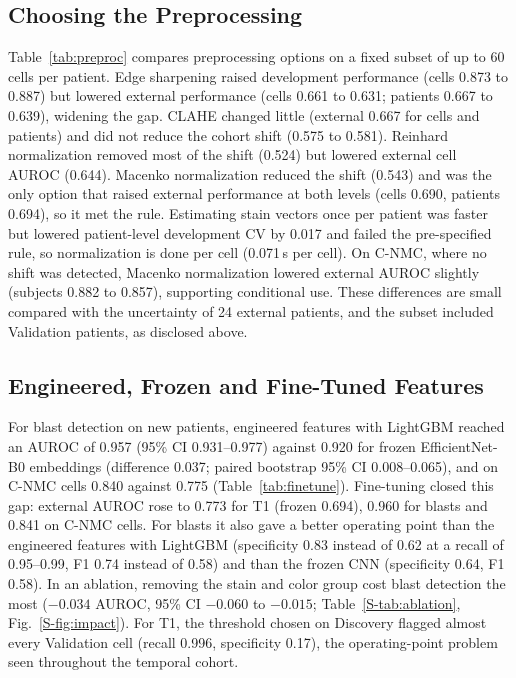 \documentclass[journal]{IEEEtran}
\begin{document}
\subsection{Choosing the Preprocessing}
\label{sec:preproc}
Table~\ref{tab:preproc} compares preprocessing options on a fixed subset of up to 60 cells per patient. Edge sharpening raised development performance (cells 0.873 to 0.887) but lowered external performance (cells 0.661 to 0.631; patients 0.667 to 0.639), widening the gap. CLAHE changed little (external 0.667 for cells and patients) and did not reduce the cohort shift (0.575 to 0.581). Reinhard normalization removed most of the shift (0.524) but lowered external cell AUROC (0.644). Macenko normalization reduced the shift (0.543) and was the only option that raised external performance at both levels (cells 0.690, patients 0.694), so it met the rule. Estimating stain vectors once per patient was faster but lowered patient-level development CV by 0.017 and failed the pre-specified rule, so normalization is done per cell (0.071\,s per cell). On C-NMC, where no shift was detected, Macenko normalization lowered external AUROC slightly (subjects 0.882 to 0.857), supporting conditional use. These differences are small compared with the uncertainty of 24 external patients, and the subset included Validation patients, as disclosed above.



\subsection{Engineered, Frozen and Fine-Tuned Features}
For blast detection on new patients, engineered features with LightGBM reached an AUROC of 0.957 (95\% CI 0.931--0.977) against 0.920 for frozen EfficientNet-B0 embeddings (difference 0.037; paired bootstrap 95\% CI 0.008--0.065), and on C-NMC cells 0.840 against 0.775 (Table~\ref{tab:finetune}). Fine-tuning closed this gap: external AUROC rose to 0.773 for T1 (frozen 0.694), 0.960 for blasts and 0.841 on C-NMC cells. For blasts it also gave a better operating point than the engineered features with LightGBM (specificity 0.83 instead of 0.62 at a recall of 0.95--0.99, F1 0.74 instead of 0.58) and than the frozen CNN (specificity 0.64, F1 0.58). In an ablation, removing the stain and color group cost blast detection the most ($-0.034$ AUROC, 95\% CI $-0.060$ to $-0.015$; Table~\ref{S-tab:ablation}, Fig.~\ref{S-fig:impact}). For T1, the threshold chosen on Discovery flagged almost every Validation cell (recall 0.996, specificity 0.17), the operating-point problem seen throughout the temporal cohort.
\end{document}

